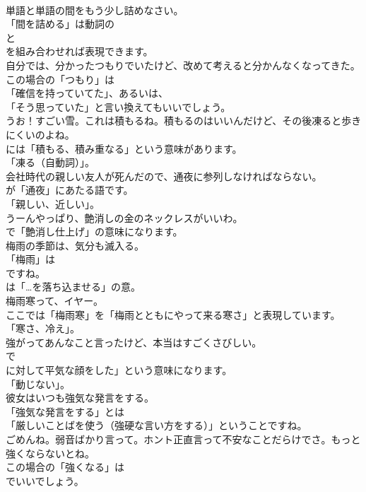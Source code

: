 \documentclass[8pt]{extreport}
\begin{document}
\begin{CJK}{UTF8}{min}
\\	単語と単語の間をもう少し詰めなさい。 
\\	「間を詰める」は動詞の 
\\	と 
\\	を組み合わせれば表現できます。	
\\	自分では、分かったつもりでいたけど、改めて考えると分かんなくなってきた。 
\\	この場合の「つもり」は
\\	「確信を持っていてた」、あるいは、
\\	「そう思っていた」と言い換えてもいいでしょう。	
\\	うお！すごい雪。これは積もるね。積もるのはいいんだけど、その後凍ると歩きにくいのよね。 
\\	には「積もる、積み重なる」という意味があります。
\\	「凍る（自動詞）」。	
\\	会社時代の親しい友人が死んだので、通夜に参列しなければならない。 
\\	が「通夜」にあたる語です。
\\	「親しい、近しい」。	
\\	うーんやっぱり、艶消しの金のネックレスがいいわ。 
\\	で「艶消し仕上げ」の意味になります。	
\\	梅雨の季節は、気分も滅入る。 
\\	「梅雨」は 
\\	ですね。
\\	は「…を落ち込ませる」の意。	
\\	梅雨寒って、イヤー。 
\\	ここでは「梅雨寒」を「梅雨とともにやって来る寒さ」と表現しています。
\\	「寒さ、冷え」。	
\\	強がってあんなこと言ったけど、本当はすごくさびしい。 
\\	で
\\	に対して平気な顔をした」という意味になります。
\\	「動じない」。	
\\	彼女はいつも強気な発言をする。 
\\	「強気な発言をする」とは
\\	「厳しいことばを使う（強硬な言い方をする）」ということですね。	
\\	ごめんね。弱音ばかり言って。ホント正直言って不安なことだらけでさ。もっと強くならないとね。 
\\	この場合の「強くなる」は 
\\	でいいでしょう。

\end{CJK}
\end{document}
